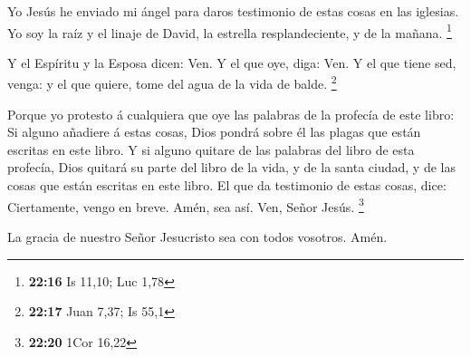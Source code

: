  Yo Jesús he enviado mi ángel para daros testimonio de
estas cosas en las iglesias. Yo soy la raíz y el linaje de David, la
estrella resplandeciente, y de la mañana. \footnote{\textbf{22:16} Is
  11,10; Luc 1,78}

 Y el Espíritu y la Esposa dicen: Ven. Y el que oye,
diga: Ven. Y el que tiene sed, venga: y el que quiere, tome del agua de
la vida de balde. \footnote{\textbf{22:17} Juan 7,37; Is 55,1}

 Porque yo protesto á cualquiera que oye las palabras de
la profecía de este libro: Si alguno añadiere á estas cosas, Dios pondrá
sobre él las plagas que están escritas en este libro.  Y
si alguno quitare de las palabras del libro de esta profecía, Dios
quitará su parte del libro de la vida, y de la santa ciudad, y de las
cosas que están escritas en este libro.  El que da
testimonio de estas cosas, dice: Ciertamente, vengo en breve. Amén, sea
así. Ven, Señor Jesús. \footnote{\textbf{22:20} 1Cor 16,22}

 La gracia de nuestro Señor Jesucristo sea con todos
vosotros. Amén.
